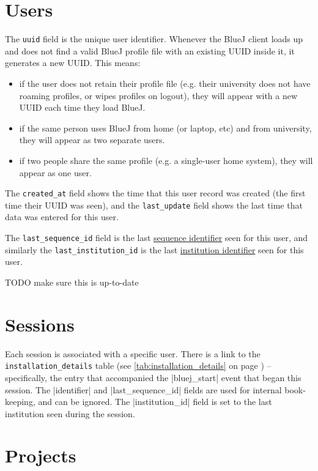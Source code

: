 \documentclass{book}
\newcommand{\myref}[1]{\autoref{#1} on page \pageref*{#1}}
\newcommand{\tabref}[1]{\lstinline|#1| table (see \myref{tab:#1})}
\begin{document}
\section{Users}


The \texttt{uuid} field is the unique user identifier.  Whenever the BlueJ
client loads up and does not find a valid BlueJ profile file with an existing
UUID inside it, it generates a new UUID.  This means:

\begin{itemize}
\item if the user does not retain their profile file (e.g. their university
  does not have roaming profiles, or wipes profiles on logout), they will
  appear with a new UUID each time they load BlueJ.
\item if the same person uses BlueJ from home (or laptop, etc) and from
  university, they will appear as two separate users.
\item if two people share the same profile (e.g. a single-user home system),
  they will appear as one user.
\end{itemize}

The \texttt{created\_at} field shows the time that this user record was
created (the first time their UUID was seen), and the \texttt{last\_update} field shows the last time that data was entered for
this user.

The \texttt{last\_sequence\_id} field is the last \hyperref[def:sequence_id]{sequence identifier} seen for
this user, and similarly the \texttt{last\_institution\_id} is the last
\hyperref[def:institution_id]{institution identifier} seen for this user.

TODO make sure this is up-to-date

\section{Sessions}


Each session is associated with a specific user.  There is a link to
the \tabref{installation_details} -- specifically, the entry that
accompanied the |bluej_start| event that began this session.  The
|identifier| and |last_sequence_id| fields are used for internal
book-keeping, and can be ignored.  The |institution_id| field is set
to the last institution seen during the session.

\section{Projects}
\end{document}
